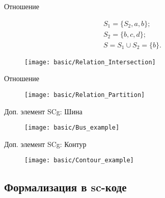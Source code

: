 \begin{frame}[shrink=10]{Отношение }
  \begin{center}
    \begin{eqnarray*}
      S_1 = \{ S_2, a, b \}; \\
      S_2 = \{ b, c, d \}; \\
      S = S_1 \cup S_2 = \{ b \}.
    \end{eqnarray*}

    \objeqv

    \begin{figure}
      \texttt{[image: basic/Relation\_Intersection]}
    \end{figure}
  \end{center}
\end{frame}

\begin{frame}[shrink=10]{Отношение }
  \begin{center}
    \begin{figure}
      \texttt{[image: basic/Relation\_Partition]}
    \end{figure}
  \end{center}
\end{frame}


\begin{frame}{Доп. элемент SCg: Шина}
  \begin{center}
    \begin{figure}
      \texttt{[image: basic/Bus\_example]}
    \end{figure}
  \end{center}
\end{frame}

\begin{frame}{Доп. элемент SCg: Контур}
  \begin{center}
    \begin{figure}
      \texttt{[image: basic/Contour\_example]}
    \end{figure}
  \end{center}
\end{frame}

\subsection{Формализация в sc-коде}

